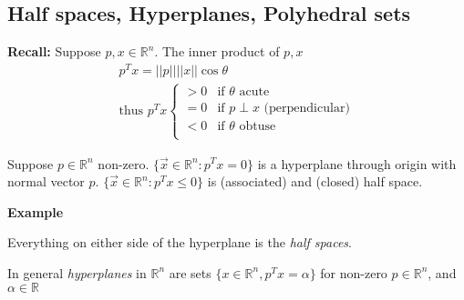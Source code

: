 \subsection*{Half spaces, Hyperplanes, Polyhedral sets}
\textbf{Recall: } Suppose $p,x \in \mathbb{R}^n$. The inner product of $p,x$
\begin{gather*}
	p^Tx = \left||p|\right| \left||x|\right| \cos \theta\\
	\text{thus } p^Tx 
	\begin{cases}
		> 0 & \text{if $\theta$ acute}\\
		= 0 & \text{if $p \perp x$ (perpendicular)}\\
		< 0 & \text{if $\theta$ obtuse}\\
	\end{cases}
\end{gather*}
\begin{definition-N}
	Suppose $p \in \mathbb{R}^n$ non-zero. $\{\vec{x} \in \mathbb{R}^n : p^T x = 0 \}$ is a hyperplane through origin with normal vector $p$. $\{\vec{x} \in \mathbb{R}^n : p^T x \leq 0 \}$ is (associated) and (closed) half space.
\end{definition-N}
\textbf{Example}
	\begin{center}
	\end{center}
Everything on either side of the hyperplane is the \emph{half spaces}.
\begin{definition-N}
	In general \emph{hyperplanes} in $\mathbb{R}^n$ are sets $\{x \in \mathbb{R}^n, p^Tx = \alpha \}$ for non-zero $p \in \mathbb{R}^n$, and $\alpha \in \mathbb{R}$
\end{definition-N}
